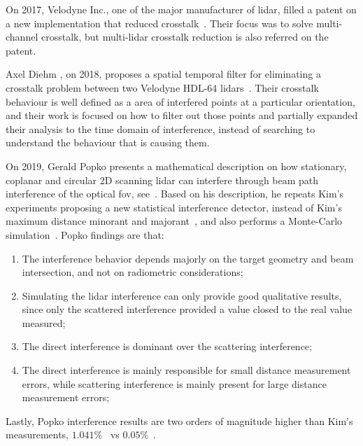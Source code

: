 On 2017, Velodyne Inc., one of the major manufacturer of \ac{lidar}, filled a patent on a new implementation that reduced crosstalk~\cite{Hall2017}. Their focus was to solve multi-channel crosstalk, but multi-\ac{lidar} crosstalk reduction is also referred on the patent.

Axel Diehm \etal, on 2018, proposes a spatial temporal filter for eliminating a crosstalk problem between two Velodyne HDL-64 \acp{lidar}~\cite{Hebel2018}. Their crosstalk behaviour is well defined as a area of interfered points at a particular orientation, and their work is focused on how to filter out those points and partially expanded their analysis to the time domain of interference, instead of searching to understand the behaviour that is causing them.

On 2019, Gerald Popko \etal presents a mathematical description on how stationary, coplanar and circular 2D scanning \ac{lidar} can interfere through beam path interference of the optical \ac{fov}, see~\cite{Popko2019a}. Based on his description, he repeats Kim's \etal experiments proposing a new statistical interference detector, instead of Kim's maximum distance minorant and majorant~\cite{Kim2015a}, and also performs a Monte-Carlo simulation~\cite{Popko2019b}. Popko \etal findings are that:

\begin{enumerate}
	\item The interference behavior depends majorly on the target geometry and beam intersection, and not on radiometric considerations;
	\item Simulating the \ac{lidar} interference can only provide good qualitative results, since only the scattered interference provided a value closed to the real value measured;
	\item The direct interference is dominant over the scattering interference;
	\item The direct interference is mainly responsible for small distance measurement errors, while scattering interference is mainly present for large distance measurement errors;
\end{enumerate}

Lastly, Popko \etal interference results are two orders of magnitude higher than Kim's \etal measurements, $1.041 \%$~\cite{Popko2019b} vs $0.05\%$~\cite{Kim2015a}.

